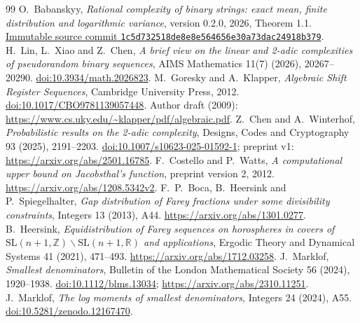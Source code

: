 \documentclass[11pt]{article}
\theoremstyle{definition}\newtheorem{definition}[theorem]{Definition}
\theoremstyle{remark}\newtheorem{remark}[theorem]{Remark}
\begin{document}
\begin{thebibliography}{99}
O.~Babanskyy,
\emph{Rational complexity of binary strings: exact mean, finite
distribution and logarithmic variance}, version 0.2.0, 2026, Theorem 1.1.
\href{https://github.com/aconsciousfractal/FCIG-Exact-Mean-Bound-for-the-Rational-Complexity-of-Binary-Strings/tree/1c5d732518de8e8e564656e30a73dac24918b379}{Immutable source commit \texttt{1c5d732518de8e8e564656e30a73dac24918b379}}.
H.~Lin, L.~Xiao and Z.~Chen,
\emph{A brief view on the linear and 2-adic complexities of pseudorandom
binary sequences}, AIMS Mathematics 11(7) (2026), 20267--20290.
\href{https://doi.org/10.3934/math.2026823}{doi:10.3934/math.2026823}.
M.~Goresky and A.~Klapper,
\emph{Algebraic Shift Register Sequences}, Cambridge University Press, 2012.
\href{https://doi.org/10.1017/CBO9781139057448}{doi:10.1017/CBO9781139057448}.
Author draft (2009): \url{https://www.cs.uky.edu/~klapper/pdf/algebraic.pdf}.
Z.~Chen and A.~Winterhof,
\emph{Probabilistic results on the 2-adic complexity},
Designs, Codes and Cryptography 93 (2025), 2191--2203.
\href{https://doi.org/10.1007/s10623-025-01592-1}{doi:10.1007/s10623-025-01592-1};
preprint v1: \url{https://arxiv.org/abs/2501.16785}.
F.~Costello and P.~Watts,
\emph{A computational upper bound on Jacobsthal's function},
preprint version 2, 2012.
\url{https://arxiv.org/abs/1208.5342v2}.
F.~P.~Boca, B.~Heersink and P.~Spiegelhalter,
\emph{Gap distribution of Farey fractions under some divisibility constraints},
Integers 13 (2013), A44.
\url{https://arxiv.org/abs/1301.0277}.
B.~Heersink,
\emph{Equidistribution of Farey sequences on horospheres in covers of
\(\mathrm{SL}(n+1,\mathbb Z)\backslash\mathrm{SL}(n+1,\mathbb R)\)
and applications},
Ergodic Theory and Dynamical Systems 41 (2021), 471--493.
\url{https://arxiv.org/abs/1712.03258}.
J.~Marklof, \emph{Smallest denominators},
Bulletin of the London Mathematical Society 56 (2024), 1920--1938.
\href{https://doi.org/10.1112/blms.13034}{doi:10.1112/blms.13034};
\url{https://arxiv.org/abs/2310.11251}.
J.~Marklof, \emph{The log moments of smallest denominators},
Integers 24 (2024), A55.
\href{https://doi.org/10.5281/zenodo.12167470}{doi:10.5281/zenodo.12167470}.
\end{thebibliography}
\end{document}
